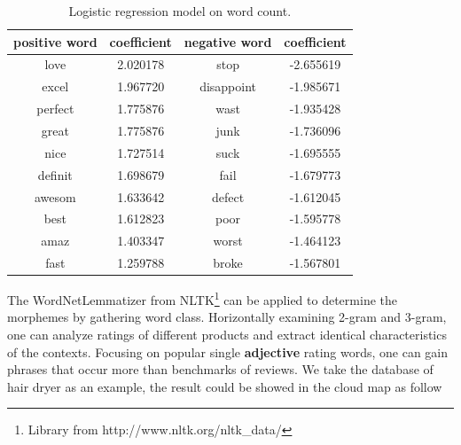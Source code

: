 \documentclass[12pt]{article}%
\begin{document}
\begin{table}[H]
	\centering
	\caption{Logistic regression model on word count.}	
	\begin{tabular}{cccc}
		\toprule[1.5pt]
		\multicolumn{1}{m{3cm}}{\centering positive word} & \multicolumn{1}{m{3cm}}{\centering coefficient}&
		\multicolumn{1}{m{3cm}}{\centering negative word}&
		\multicolumn{1}{m{3cm}}{\centering coefficient} \\
		\midrule[1pt]
		love     	 & 2.020178 & stop   &-2.655619\\
		excel     & 1.967720 &disappoint    &-1.985671\\
		perfect     &1.775876&wast    &-1.935428\\
		great          &1.775876&junk        &-1.736096\\
		 nice     &1.727514& suck    &-1.695555\\
		definit          & 1.698679& fail    &-1.679773\\
		awesom          &1.633642&defect        &-1.612045\\
		best        &1.612823&poor      &-1.595778\\
amaz        &1.403347&worst       &-1.464123\\
fast       &1.259788&broke          &-1.567801\\
		\bottomrule[1.6pt]
	\end{tabular}\label{biasso}
\end{table}
The WordNetLemmatizer from NLTK\footnote{\quad Library from http://www.nltk.org/nltk\_data/} can be applied to determine the morphemes by gathering word class. Horizontally examining 2-gram and 3-gram, one can analyze ratings of different products and extract identical characteristics of the contexts. Focusing on popular single \textbf{adjective} rating words, one can gain phrases that occur more than benchmarks of reviews. We take the database of hair dryer as an example, the result could be showed in the cloud map as follow
\end{document}
